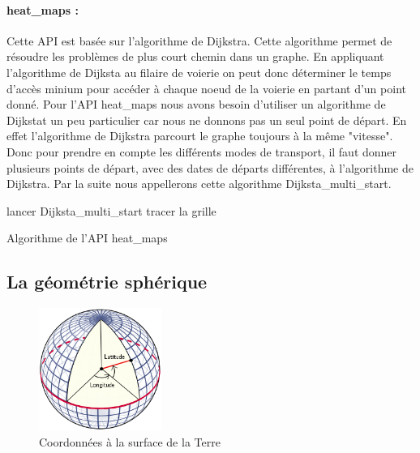 \documentclass[a4paper]{report}
\begin{document}
\paragraph{heat\_maps :} Cette API est basée sur l'algorithme de Dijkstra. Cette algorithme permet de résoudre les problèmes de plus court chemin dans un graphe. En appliquant l'algorithme de Dijksta au filaire de voierie on peut donc déterminer le temps d'accès minium pour accéder à chaque noeud de la voierie en partant d'un point donné. Pour l'API heat\_maps nous avons besoin d'utiliser un algorithme de Dijkstat un peu particulier car nous ne donnons pas un seul point de départ. En effet l'algorithme de Dijkstra parcourt le graphe toujours à la même "vitesse". Donc pour prendre en compte les différents modes de transport, il faut donner plusieurs points de départ, avec des dates de départs différentes, à l'algorithme de Dijkstra. Par la suite nous appellerons cette algorithme Dijksta\_multi\_start.
\newline

\begin{algorithm}[H]
 lancer Dijksta\_multi\_start \;
 tracer la grille\:
 \caption{Algorithme de l'API heat\_maps}
\end{algorithm}

\subsection{La géométrie sphérique}

\begin{figure}
		\includegraphics[width=4cm]{image/lat_lon}
		\caption{Coordonnées à la surface de la Terre}
		\label{Coordonnées à la surface de la Terre}
\end{figure}
\end{document}

